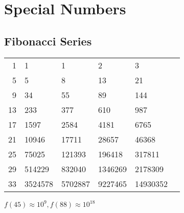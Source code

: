 \documentclass[a4paper,10pt,twocolumn,oneside,x11names]{article}
\begin{document}
\section{Special Numbers}

\subsection{Fibonacci Series}

{\normalsize
\begin{center}
    \begin{tabular}{r|lllll}
        1 & 1 & 1 & 2 & 3 \\
        5 & 5 & 8 & 13 & 21 \\
        9 & 34 & 55 & 89 & 144 \\
        13 & 233 & 377 & 610 & 987 \\
        17 & 1597 & 2584 & 4181 & 6765 \\
        21 & 10946 & 17711 & 28657 & 46368 \\
        25 & 75025 & 121393 & 196418 & 317811 \\
        29 & 514229 & 832040 & 1346269 & 2178309 \\
        33 & 3524578 & 5702887 & 9227465 & 14930352
    \end{tabular}
\end{center}
\noindent
$f(45) \approx 10^9, f(88) \approx 10^{18}$
}
\end{document}
